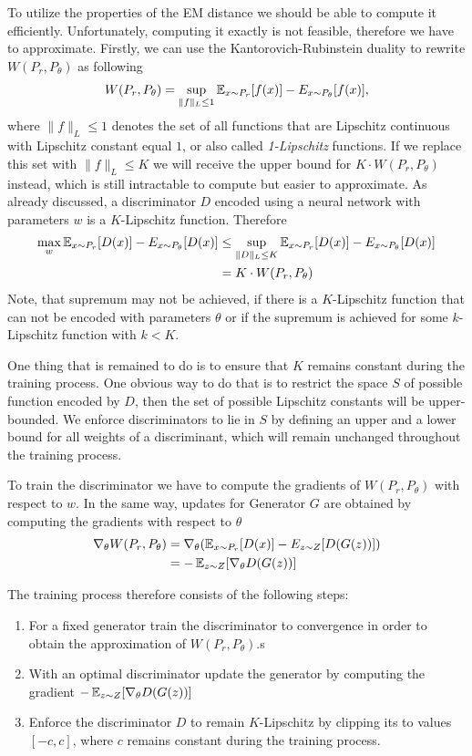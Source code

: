To utilize the properties of the EM distance we should be able to compute it efficiently. Unfortunately, computing it exactly is not feasible, therefore we have to approximate. 
Firstly, we can use the Kantorovich-Rubinstein duality to rewrite $W(P_r, P_\theta)$ as following
\begin{equation}
	W(P_r, P_\theta) = \sup_{\lVert f \lVert_L \leq 1} \operatorname{\mathbb{E}}_{x \sim P_r}[f(x)] - E_{x \sim P_\theta} [f(x)],	
\end{equation}
where ${\lVert f \lVert_L \leq 1}$ denotes the set of all functions that are Lipschitz continuous with Lipschitz constant equal $1$, or also called \textit{1-Lipschitz} functions. If we replace this set with ${\lVert f \lVert_L \leq K}$ we will receive the upper bound for $K \cdot W(P_r, P_\theta)$ instead, which is still intractable to compute but easier to approximate. As already discussed, a discriminator $D$  encoded using a neural network with parameters $w$ is a $K$-Lipschitz function. Therefore
\begin{align*}
\max_w \operatorname{\mathbb{E}}_{x \sim P_r}[D(x)] - E_{x \sim P_\theta} [D(x)] &\leq \sup_{\lVert D \lVert_L \leq K} \operatorname{\mathbb{E}}_{x \sim P_r}[D(x)] - E_{x \sim P_\theta} [D(x)] \\
 &= K \cdot W(P_r, P_\theta)
\end{align*}
Note, that supremum may not be achieved, if there is a $K$-Lipschitz function that can not be encoded with parameters $\theta$ or if the supremum is achieved for some $k$-Lipschitz function with $k < K$.

One thing that is remained to do is to ensure that $K$ remains constant during the training process. One obvious way to do that is to restrict the space $S$ of possible function encoded by $D$, then the set of possible Lipschitz constants will be upper-bounded. We enforce discriminators to lie in $S$ by defining an upper and a lower bound for all weights of a discriminant, which will remain unchanged throughout the training process.
 
To train the discriminator we have to compute the gradients of $W(P_r, P_\theta)$ with respect to $w$. In the same way, updates for Generator $G$ are obtained by computing the gradients with respect to $\theta$ 
\begin{align*}
\nabla_\theta W(P_r, P_\theta) &= \nabla_\theta(\operatorname{\mathbb{E}}_{x \sim P_r}[D(x)] - E_{z \sim Z} [D(G(z))]) \\
&= - \operatorname{\mathbb{E}}_{z \sim Z} [\nabla_\theta D(G(z))]
\end{align*}

The training process therefore consists of the following steps:
\begin{enumerate}
	\item For a fixed generator train the discriminator to convergence in order to obtain the approximation of $W(P_r, P_\theta)$.s
	\item With an optimal discriminator update the generator by computing the gradient $- \operatorname{\mathbb{E}}_{z \sim Z} [\nabla_\theta D(G(z))]$
	\item Enforce the discriminator $D$ to remain $K$-Lipschitz by clipping its to values $[-c, c]$, where $c$ remains constant during the training process. 
\end{enumerate}

